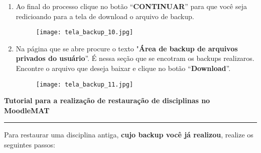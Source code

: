 \documentclass[12pt]{report}
\begin{document}
\begin{enumerate}[\bf 1)]
  	\newpage

        \item\label{final_backup} Ao final do processo clique no botão ``\textbf{CONTINUAR}'' para que você seja redicioando para a tela de download o arquivo de backup.
	\begin{figure}[H]
    	\centering
    	\hspace*{-2.5cm}\texttt{[image: tela\_backup\_10.jpg]}
  	\end{figure}

  	\newpage

        \item Na página que se abre procure o texto "\textbf{Área de backup de arquivos privados do usuário}''. É nessa seção que se encotram os backups realizaros. Encontre o arquivo que deseja baixar e clique no botão ``\textbf{Download}''.
	\begin{figure}[H]
	   \centering
	   \hspace*{-2.5cm}\texttt{[image: tela\_backup\_11.jpg]}
  	\end{figure}
\end{enumerate}

\newpage
\begin{center}
{\Large \textbf{Tutorial para a realiza\c{c}\~ao de restauração de disciplinas no MoodleMAT}}
\end{center}

\vspace{.3cm}

\hrule

\vspace{.7cm}
Para restaurar uma disciplina antiga, \textbf{cujo backup voc\^e j\'a realizou}, realize os seguintes passos:
\end{document}
